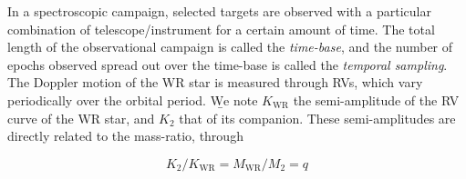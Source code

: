 In a spectroscopic campaign, selected targets are observed with a particular combination of telescope/instrument for a certain amount of time. The total length of the observational campaign is called the \textit{time-base}, and the number of epochs observed spread out over the time-base is called the \textit{temporal sampling}. The Doppler motion of the WR star is measured through RVs, which vary periodically over the orbital period. \b{We note $K_{\textrm{WR}}$ the semi-amplitude of the RV curve of the WR star, and $K_2$ that of its companion.} These semi-amplitudes are directly related to the mass-ratio, through

\begin{equation}
    K_2/K_{\textrm{WR}} = M_{\textrm{WR}}/M_2 = q
\end{equation}

